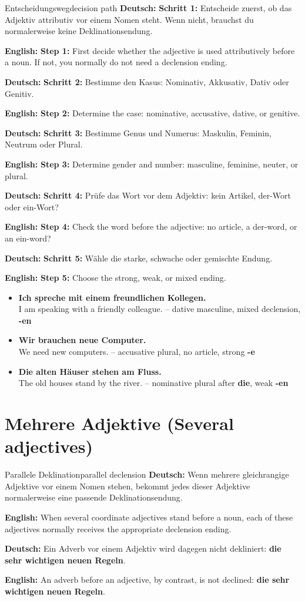 \documentclass[a4paper,11pt]{article}
\newcommand{\GermanText}[1]{\textbf{Deutsch: }#1\par}
\newcommand{\EnglishText}[1]{{\small\color{SoftGray}\textbf{English: }#1\par}}
\newcommand{\ExampleItem}[2]{\item \textbf{#1}\\{\small\color{SoftGray}#2}}
\begin{document}
\begin{grammarentry}{Entscheidungsweg}{decision path}
\GermanText{\textbf{Schritt 1:} Entscheide zuerst, ob das Adjektiv attributiv vor einem Nomen steht. Wenn nicht, brauchst du normalerweise keine Deklinationsendung.}
\EnglishText{\textbf{Step 1:} First decide whether the adjective is used attributively before a noun. If not, you normally do not need a declension ending.}

\GermanText{\textbf{Schritt 2:} Bestimme den Kasus: Nominativ, Akkusativ, Dativ oder Genitiv.}
\EnglishText{\textbf{Step 2:} Determine the case: nominative, accusative, dative, or genitive.}

\GermanText{\textbf{Schritt 3:} Bestimme Genus und Numerus: Maskulin, Feminin, Neutrum oder Plural.}
\EnglishText{\textbf{Step 3:} Determine gender and number: masculine, feminine, neuter, or plural.}

\GermanText{\textbf{Schritt 4:} Prüfe das Wort vor dem Adjektiv: kein Artikel, der-Wort oder ein-Wort?}
\EnglishText{\textbf{Step 4:} Check the word before the adjective: no article, a der-word, or an ein-word?}

\GermanText{\textbf{Schritt 5:} Wähle die starke, schwache oder gemischte Endung.}
\EnglishText{\textbf{Step 5:} Choose the strong, weak, or mixed ending.}
\end{grammarentry}

\begin{exbox}
\begin{itemize}
\ExampleItem{Ich spreche mit einem freundlichen Kollegen.}{I am speaking with a friendly colleague. -- dative masculine, mixed declension, \textbf{-en}}
\ExampleItem{Wir brauchen neue Computer.}{We need new computers. -- accusative plural, no article, strong \textbf{-e}}
\ExampleItem{Die alten Häuser stehen am Fluss.}{The old houses stand by the river. -- nominative plural after \textbf{die}, weak \textbf{-en}}
\end{itemize}
\end{exbox}

\section{Mehrere Adjektive \textnormal{(Several adjectives)}}

\begin{grammarentry}{Parallele Deklination}{parallel declension}
\GermanText{Wenn mehrere gleichrangige Adjektive vor einem Nomen stehen, bekommt jedes dieser Adjektive normalerweise eine passende Deklinationsendung.}
\EnglishText{When several coordinate adjectives stand before a noun, each of these adjectives normally receives the appropriate declension ending.}

\GermanText{Ein Adverb vor einem Adjektiv wird dagegen nicht dekliniert: \textbf{die sehr wichtigen neuen Regeln}.}
\EnglishText{An adverb before an adjective, by contrast, is not declined: \textbf{die sehr wichtigen neuen Regeln}.}
\end{grammarentry}
\end{document}
